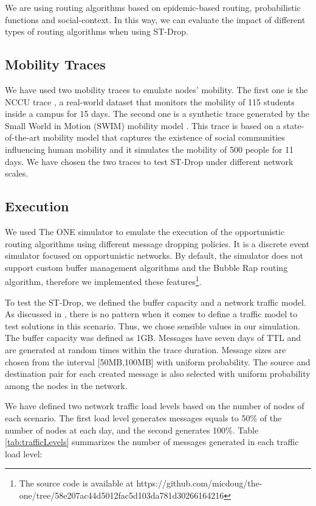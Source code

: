 We are using routing algorithms based on epidemic-based routing, probabilistic functions and social-context.
In this way, we can evaluate the impact of different types of routing algorithms when using ST-Drop.

\subsection{Mobility Traces}
\label{sec:datasets}

We have used two mobility traces to emulate nodes' mobility. The first one is the NCCU trace \cite{tsai2015nccu}, a real-world dataset that monitors the mobility of 115 students inside
a campus for 15 days. The second one is a synthetic trace generated by the Small World in Motion (SWIM) mobility model \cite{swim-secon10}. This trace is based on a state-of-the-art mobility
model that captures the existence of social communities influencing human mobility and it simulates the mobility of 500 people for 11 days. We have chosen the two traces to test ST-Drop
under different network scales.

\subsection{Execution}
\label{sec:simulation}

We used The ONE simulator \cite{keranen2009one} to emulate the execution of the opportunistic routing algorithms using different message dropping policies. It is a discrete event
simulator focused on opportunistic networks. By default, the simulator does not support custom buffer management algorithms and the Bubble Rap routing algorithm, therefore we
implemented these features\footnote{The source code is available at https://github.com/micdoug/the-one/tree/58e207ac44d5012fac5d103da781d30266164216}.

To test the ST-Drop, we defined the buffer capacity and a network traffic model. As discussed in \cite{grasic2012analysis}, there is no pattern when it comes to define a traffic
model to test solutions in this scenario. Thus, we chose sensible values in our simulation. The buffer capacity was defined as 1GB. Messages have seven days of TTL and are generated
at random times within the trace duration. Message sizes are chosen from the interval [50MB,100MB] with uniform probability. The source and destination pair for each created message
is also selected with uniform probability among the nodes in the network.

We have defined two network traffic load levels based on the number of nodes of each scenario. The first load level generates messages equals to 50\% of the number of nodes at each
day, and the second generates 100\%. Table \ref{tab:trafficLevels} summarizes the number of messages generated in each traffic load level:

